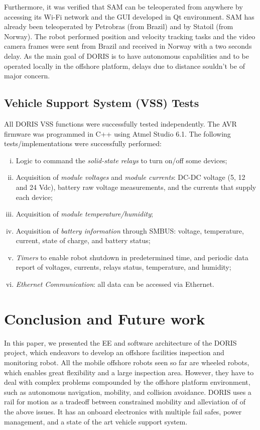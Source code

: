 \documentclass{ifacconf}
\begin{document}
Furthermore, it was verified that SAM can be teleoperated from anywhere by
accessing its Wi-Fi network and the GUI developed in Qt environment. SAM has
already been teleoperated by Petrobras (from Brazil) and by Statoil (from Norway). The robot performed position and
velocity tracking tasks and the video camera frames were sent from Brazil and
received in Norway with a two seconds delay. As the main goal of DORIS is to
have autonomous capabilities and to be operated locally in the offshore
platform, delays due to distance souldn't be of major concern.

\subsection{Vehicle Support System (VSS) Tests}\label{sec:VSS_tests}
All DORIS VSS functions were successfully tested independently. The AVR firmware was programmed in C++ using Atmel Studio 6.1.
The following tests/implementations were successfully performed:
\begin{enumerate}[i)]
    \item Logic to command the \emph{solid-state relays} to turn on/off some devices;
    \item Acquisition of \emph{module voltages} and \emph{module currents}:
    DC-DC voltage (5, 12 and 24 Vdc), battery raw voltage measurements, and the
    currents that supply each device;
    \item Acquisition of \emph{module temperature/humidity};
    \item Acquisition of \emph{battery information} through SMBUS: voltage,
    temperature, current, state of charge, and battery status;
    \item \emph{Timers} to enable robot shutdown in predetermined time, and
    periodic data report of voltages, currents, relays status, temperature, and
    humidity;
    \item \emph{Ethernet Communication}: all data can be accessed via Ethernet.
\end{enumerate}

\section{Conclusion and Future work}\label{sec:conclusions}

In this paper, we presented the EE and software architecture
of the DORIS project, which endeavors to develop an offshore facilities
inspection and monitoring robot. All the mobile offshore robots seen so far are
wheeled robots,  which enables great flexibility and a large inspection area. However,
they have to deal with complex problems compounded by the offshore platform environment,
such as autonomous navigation, mobility, and collision avoidance. DORIS uses a
rail for motion as a tradeoff between constrained mobility and alleviation of
of the above issues. It has an onboard electronics with multiple fail safes,
power management, and a state of the art vehicle support system.
\end{document}
